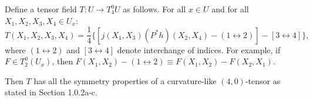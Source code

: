 Define a tensor field $T: U \to T_4^0 U$ as follows. For all $x \in U$ and for all $X_1, X_2, X_3, X_4 \in U_x$:
$$T(X_1, X_2, X_3, X_4) = \frac{1}{4}\Big\{[j(X_1, X_3)(P^* h)(X_2, X_4) - (1 \leftrightarrow 2)] - [3 \leftrightarrow 4]\Big\},$$
where $(1 \leftrightarrow 2)$ and $[3 \leftrightarrow 4]$ denote interchange of indices. For example, if $F \in T_2^0(U_x)$, then $F(X_1, X_2) - (1 \leftrightarrow 2) \equiv F(X_1, X_2) - F(X_2, X_1)$.

Then $T$ has all the symmetry properties of a curvature-like $(4,0)$-tensor as stated in Section 1.0.2a-c.
